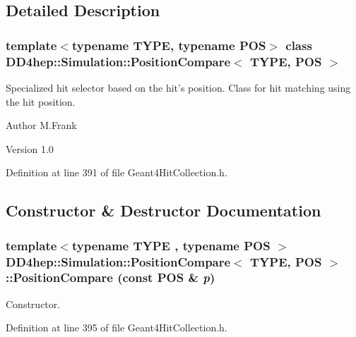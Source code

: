 \subsection{Detailed Description}
\subsubsection*{template$<$typename TYPE, typename POS$>$ class DD4hep::Simulation::PositionCompare$<$ TYPE, POS $>$}

Specialized hit selector based on the hit's position. Class for hit matching using the hit position.

\begin{DoxyAuthor}{Author}
M.Frank 
\end{DoxyAuthor}
\begin{DoxyVersion}{Version}
1.0 
\end{DoxyVersion}


Definition at line 391 of file Geant4HitCollection.h.

\subsection{Constructor \& Destructor Documentation}
\hypertarget{class_d_d4hep_1_1_simulation_1_1_position_compare_a68fc69a87bb8ea3da749e17642c7b366}{
\subsubsection[{PositionCompare}]{\setlength{\rightskip}{0pt plus 5cm}template$<$typename TYPE , typename POS $>$ {\bf DD4hep::Simulation::PositionCompare}$<$ TYPE, POS $>$::{\bf PositionCompare} (const POS \& {\em p})}}
\label{class_d_d4hep_1_1_simulation_1_1_position_compare_a68fc69a87bb8ea3da749e17642c7b366}


Constructor. 

Definition at line 395 of file Geant4HitCollection.h.

